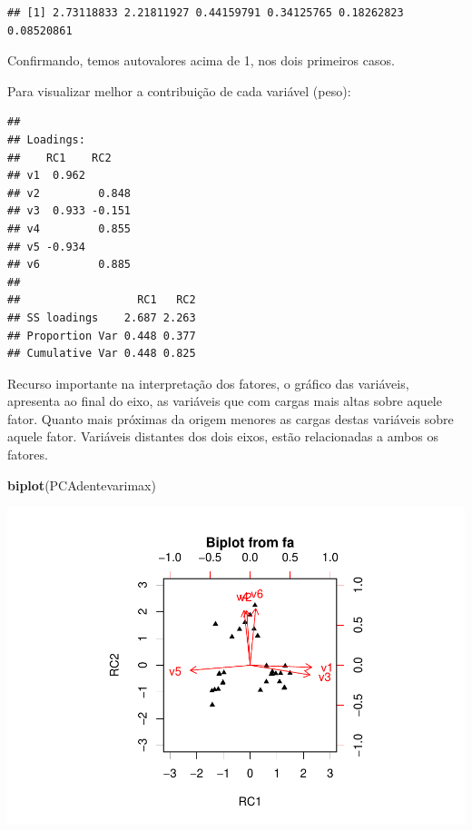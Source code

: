 \documentclass[12pt,brazil,]{book}
\newenvironment{Shaded}{\begin{snugshade}}{\end{snugshade}}
\newcommand{\KeywordTok}[1]{\textcolor[rgb]{0.13,0.29,0.53}{\textbf{#1}}}
\newcommand{\NormalTok}[1]{#1}
\newcommand{\OperatorTok}[1]{\textcolor[rgb]{0.81,0.36,0.00}{\textbf{#1}}}
\begin{document}
\begin{verbatim}
## [1] 2.73118833 2.21811927 0.44159791 0.34125765 0.18262823 0.08520861
\end{verbatim}

Confirmando, temos autovalores acima de 1, nos dois primeiros casos.

Para visualizar melhor a contribuição de cada variável (peso):

\begin{Shaded}
\end{Shaded}

\begin{verbatim}
## 
## Loadings:
##    RC1    RC2   
## v1  0.962       
## v2         0.848
## v3  0.933 -0.151
## v4         0.855
## v5 -0.934       
## v6         0.885
## 
##                  RC1   RC2
## SS loadings    2.687 2.263
## Proportion Var 0.448 0.377
## Cumulative Var 0.448 0.825
\end{verbatim}

Recurso importante na interpretação dos fatores, o gráfico das
variáveis, apresenta ao final do eixo, as variáveis que com cargas mais
altas sobre aquele fator. Quanto mais próximas da origem menores as
cargas destas variáveis sobre aquele fator. Variáveis distantes dos dois
eixos, estão relacionadas a ambos os fatores.

\begin{Shaded}
\begin{Highlighting}[]
\KeywordTok{biplot}\NormalTok{(PCAdentevarimax)}
\end{Highlighting}
\end{Shaded}

\includegraphics{03-AnaliseFat_files/figure-latex/unnamed-chunk-13-1.pdf}
\end{document}
